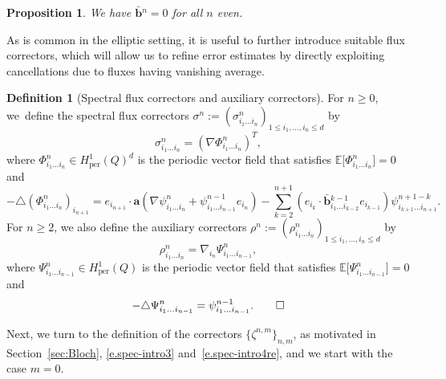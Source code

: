 \documentclass[JEP,XML,SOM,Unicode,published]{cedram}
\theoremstyle{plain}
\newtheorem{prop0}[theor0]{Proposition}
\newenvironment{prop}
{\renewcommand{\qedsymbol}{$\lozenge$}\pushQED{\qed}\begin{prop0}}
{\popQED\end{prop0}}
\theoremstyle{definition}
\newtheorem{defin0}[theor0]{Definition}
\newenvironment{defin}
{\renewcommand{\qedsymbol}{$\lozenge$}\pushQED{\qed}\begin{defin0}}
{\popQED\end{defin0}}
\numberwithin{equation}{section}
\newcommand{\per}{{\operatorname{per}}}
\newcommand{\ee}{e}
\newcommand{\Aa}{\boldsymbol a}
\newcommand{\bb}{{\boldsymbol b}}
\newcommand{\expecm}[1]{\mathbb{E}\bigl[ #1 \bigr]}\let\bexpec\expecm
\begin{document}
\begin{prop}\label{prop:vanish}
We have $\bar\bb{}^{n}=0$ for all $n$ even.
\end{prop}

As is common in the elliptic setting, it is useful to further introduce suitable flux correctors, which will allow us to refine error estimates by directly exploiting cancellations due to fluxes having vanishing average.

\begin{defin}[Spectral flux correctors and auxiliary correctors]\label{def:spec-fluc-corr-psi}
For $n\ge0$, we~define the spectral flux correctors $\sigma^n:=(\sigma^n_{i_1\ldots i_n})_{1\le i_1,\ldots,i_n\le d}$ by
\[\sigma_{i_1\ldots i_n}^n=(\nabla\Phi_{i_1\ldots i_n}^n)^T,\]
where $\Phi^n_{i_1\ldots i_n}\in H^1_\per(Q)^d$ is the periodic vector field that satisfies $\expecm{\Phi_{i_1\ldots i_n}^n}=0$ and
\[-\triangle (\Phi_{i_1\ldots i_n}^n)_{i_{n+1}}=e_{i_{n+1}}\cdot \Aa(\nabla\psi^{n}_{i_1\ldots i_{n}}+\psi^{n-1}_{i_1\ldots i_{n-1}}\ee_{i_n})
-\sum_{k=2}^{n+1}(\ee_{i_{k}}\cdot\bar\bb{}^{k-1}_{i_1\ldots i_{k-2}}\ee_{i_{k-1}})\psi^{n+1-k}_{i_{k+1}\ldots i_{n+1}}.
\]
For $n\ge2$, we also define the auxiliary correctors $\rho^n:=(\rho^n_{i_1\ldots i_n})_{1\le i_1,\ldots,i_n\le d}$ by
\[\rho^n_{i_1\ldots i_n}=\nabla_{i_n}\Psi^n_{i_1\ldots i_{n-1}},\]
where $\Psi^n_{i_1\ldots i_{n-1}}\in H^1_\per(Q)$ is the periodic vector field that satisfies $\expecm{\Psi^n_{i_1\ldots i_{n-1}}}=0$ and
\begin{equation*}
-\triangle\Psi^{n}_{i_1\ldots i_{n-1}}=\psi^{n-1}_{i_1\ldots i_{n-1}}.\qedhere
\end{equation*}
\end{defin}

Next, we turn to the definition of the correctors $\{\zeta^{n,m}\}_{n,m}$, as motivated in Section~\ref{sec:Bloch}, \cf \eqref{e.spec-intro3} and~\eqref{e.spec-intro4re}, and we start with the case $m=0$.
\end{document}
